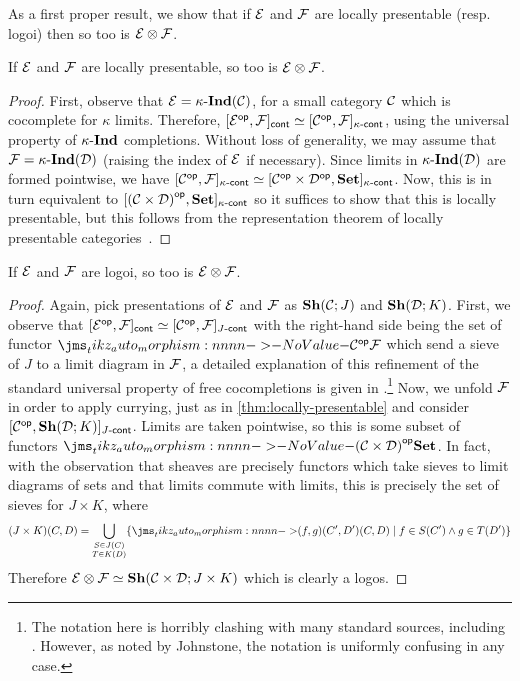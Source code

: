 \documentclass[reqno]{amsart}
\begin{document}
As a first proper result, we show that if $\mathcal{E}$ and $\mathcal{F}$ are locally presentable (resp. logoi) then
so too is $\mathcal{E} \otimes \mathcal{F}$.

\begin{theorem}
  \label{thm:locally-presentable}
  If $\mathcal{E}$ and $\mathcal{F}$ are locally presentable, so too is $\mathcal{E} \otimes \mathcal{F}$.
\end{theorem}
\begin{proof}
  First, observe that $\EE = \Ind[\kappa]{\CC}$, for a small category $\mathcal{C}$ which is cocomplete for
  $\kappa$ limits. Therefore, $\Cont{\Op{\EE}}{\FF} \Equiv \Cont[\kappa]{\Op{\CC}}{\FF}$, using the
  universal property of $\Ind[\kappa]$ completions. Without loss of generality, we may assume that
  $\FF = \Ind[\kappa]{\DD}$ (raising the index of $\mathcal{E}$ if necessary). Since limits in
  $\Ind[\kappa]{\DD}$ are formed pointwise, we have
  $\Cont[\kappa]{\Op{\CC}}{\FF} \Equiv \Cont[\kappa]{\Op{\CC} \times \Op{\DD}}{\SET}$. Now, this is
  in turn equivalent to $\Cont[\kappa]{\Op{(\CC \times \DD)}}{\SET}$ so it suffices to show that
  this is locally presentable, but this follows from the representation theorem of locally
  presentable categories~\parencite[Theorem 1.46]{adamek-rosicky:1994}.
\end{proof}

\begin{theorem}
  \label{thm:logos}
  If $\mathcal{E}$ and $\mathcal{F}$ are logoi, so too is $\mathcal{E} \otimes \mathcal{F}$.
\end{theorem}
\begin{proof}
  Again, pick presentations of $\mathcal{E}$ and $\mathcal{F}$ as $\SH{\CC}[J]$ and $\SH{\DD}[K]$. First, we observe
  that $\Cont{\Op{\EE}}{\FF} \Equiv \Cont[J]{\Op{\CC}}{\FF}$ with the right-hand side being the set
  of functor $\Mor{\Op{\CC}}{\FF}$ which send a sieve of $J$ to a limit diagram in $\mathcal{F}$, a detailed
  explanation of this refinement of the standard universal property of free cocompletions is given
  in \textcite[Corollary VII.7.4]{maclane-moerdijk:1992}.\footnote{The notation here is horribly
    clashing with many standard sources, including \parencite{maclane-moerdijk:1992}. However, as
    noted by Johnstone, the notation is uniformly confusing in any case.} Now, we unfold $\mathcal{F}$ in
  order to apply currying, just as in \cref{thm:locally-presentable} and consider
  $\Cont[J]{\Op{\CC}}{\SH{\DD}[K]}$. Limits are taken pointwise, so this is some subset of functors
  $\Mor{\Op{(\CC \times \DD)}}{\SET}$. In fact, with the observation that sheaves are precisely
  functors which take sieves to limit diagrams of sets and that limits commute with limits, this is
  precisely the set of sieves for $J \times K$, where
  \[
    (J \times K)(C,D) = \bigcup_{\substack{S \in J(C) \\ T \in K(D)}} \{\Mor[(f,g)]{(C',D')}{(C,D)} \mid f \in S(C') \land g \in T(D')\}
  \]
  Therefore $\EE \otimes \FF \Equiv \SH{\CC \times \DD}[J \times K]$ which is clearly a logos.
\end{proof}
\end{document}
